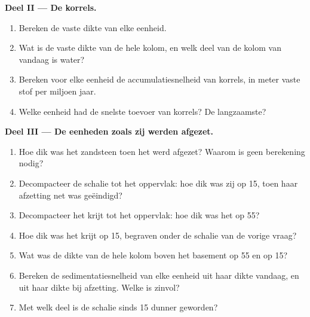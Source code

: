 \begin{problem}
\noindent\textbf{Deel II --- De korrels.}
\begin{enumerate}[resume]
  \item Bereken de vaste dikte van elke eenheid.
  \item Wat is de vaste dikte van de hele kolom, en welk deel van de kolom van vandaag is water?
  \item Bereken voor elke eenheid de accumulatiesnelheid van korrels, in meter vaste stof per miljoen jaar.
  \item Welke eenheid had de snelste toevoer van korrels? De langzaamste?
\end{enumerate}

\noindent\textbf{Deel III --- De eenheden zoals zij werden afgezet.}
\begin{enumerate}[resume]
  \item Hoe dik was het zandsteen toen het werd afgezet? Waarom is geen berekening nodig?
  \item Decompacteer de schalie tot het oppervlak: hoe dik was zij op \qty{15}{\Ma}, toen haar afzetting net was geëindigd?
  \item Decompacteer het krijt tot het oppervlak: hoe dik was het op \qty{55}{\Ma}?
  \item Hoe dik was het krijt op \qty{15}{\Ma}, begraven onder de schalie van de vorige vraag?
  \item Wat was de dikte van de hele kolom boven het basement op \qty{55}{\Ma} en op \qty{15}{\Ma}?
  \item Bereken de sedimentatiesnelheid van elke eenheid uit haar dikte vandaag, en uit haar dikte bij afzetting. Welke is zinvol?
  \item Met welk deel is de schalie sinds \qty{15}{\Ma} dunner geworden?
\end{enumerate}


\end{problem}
